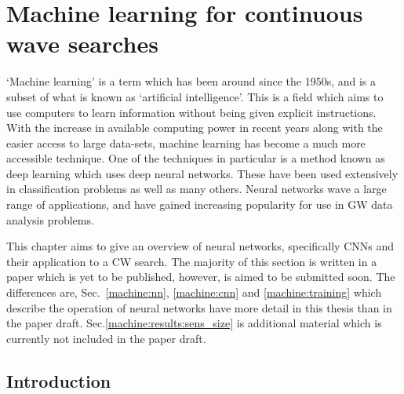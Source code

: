 \chapter[Machine learning for CWs]{\label{machine} Machine learning for continuous wave searches}


`Machine learning' is a term which has been around since the 1950s, and is a subset of what is known as `artificial intelligence'.
This is a field which aims to use computers to learn information without being given explicit instructions.
With the increase in available computing power in recent years along with the easier access to large data-sets, machine learning has become a much more accessible technique.
One of the techniques in particular is a method known as deep learning which uses deep neural networks.
These have been used extensively in classification problems as well as many others.
Neural networks wave a large range of applications, and have gained increasing popularity for use in \gls{GW} data analysis problems.

This chapter aims to give an overview of neural networks, specifically \glspl{CNN} and their application to a \gls{CW} search. 
The majority of this section is written in a paper which is yet to be published, however, is aimed to be submitted soon.
The differences are, Sec.~\ref{machine:nn}, \ref{machine:cnn} and \ref{machine:training} which describe the operation of neural networks have more detail in this thesis than in the paper draft. 
Sec.\ref{machine:results:sens_size} is additional material which is currently not included in the paper draft.


\section{\label{machine:intro} Introduction}

